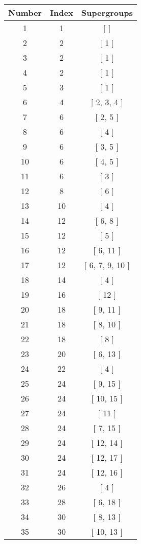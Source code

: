 \begin{center}
\begin{longtable}[H]{|| c c c ||}
\hline
Number & Index & Supergroups \\ 
\hline
1 & 1 & [ ] \\ 
\hline
2 & 2 & [ 1 ] \\ 
\hline
3 & 2 & [ 1 ] \\ 
\hline
4 & 2 & [ 1 ] \\ 
\hline
5 & 3 & [ 1 ] \\ 
\hline
6 & 4 & [ 2, 3, 4 ] \\ 
\hline
7 & 6 & [ 2, 5 ] \\ 
\hline
8 & 6 & [ 4 ] \\ 
\hline
9 & 6 & [ 3, 5 ] \\ 
\hline
10 & 6 & [ 4, 5 ] \\ 
\hline
11 & 6 & [ 3 ] \\ 
\hline
12 & 8 & [ 6 ] \\ 
\hline
13 & 10 & [ 4 ] \\ 
\hline
14 & 12 & [ 6, 8 ] \\ 
\hline
15 & 12 & [ 5 ] \\ 
\hline
16 & 12 & [ 6, 11 ] \\ 
\hline
17 & 12 & [ 6, 7, 9, 10 ] \\ 
\hline
18 & 14 & [ 4 ] \\ 
\hline
19 & 16 & [ 12 ] \\ 
\hline
20 & 18 & [ 9, 11 ] \\ 
\hline
21 & 18 & [ 8, 10 ] \\ 
\hline
22 & 18 & [ 8 ] \\ 
\hline
23 & 20 & [ 6, 13 ] \\ 
\hline
24 & 22 & [ 4 ] \\ 
\hline
25 & 24 & [ 9, 15 ] \\ 
\hline
26 & 24 & [ 10, 15 ] \\ 
\hline
27 & 24 & [ 11 ] \\ 
\hline
28 & 24 & [ 7, 15 ] \\ 
\hline
29 & 24 & [ 12, 14 ] \\ 
\hline
30 & 24 & [ 12, 17 ] \\ 
\hline
31 & 24 & [ 12, 16 ] \\ 
\hline
32 & 26 & [ 4 ] \\ 
\hline
33 & 28 & [ 6, 18 ] \\ 
\hline
34 & 30 & [ 8, 13 ] \\ 
\hline
35 & 30 & [ 10, 13 ] \\ 

\end{longtable}
\end{center}
